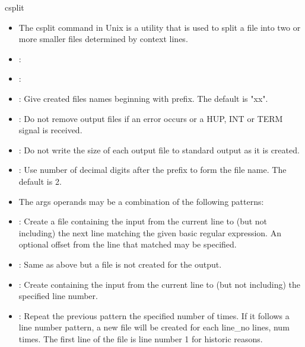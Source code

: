 \documentclass[10pt,t]{beamer}
\begin{document}
\begin{frame}[c]{csplit}
  \begin{itemize}
    \item The csplit command in Unix is a utility that is used to split a file into two or more smaller files determined by context lines.
    \item {}: 
    \item {}:
    \item[]: Give created files names beginning with prefix.  The default is "xx".
    \item[]: Do not remove output files if an error occurs or a HUP, INT or TERM signal is received.
    \item[]: Do not write the size of each output file to standard output as it is created.
    \item[]: Use number of decimal digits after the prefix to form the file name.  The default is 2.
    \item The args operands may be a combination of the following patterns:
    \item[] : Create a file containing the input from the current line to (but not including) the next line matching the given basic regular expression.  An optional offset from the line that matched may be specified.
    \item[] : Same as above but a file is not created for the output.
    \item[] : Create containing the input from the current line to (but not including) the specified line number.
    \item[] : Repeat the previous pattern the specified number of times.  If it follows a line number pattern, a new file will be created for each line\_no lines, num times.  The first line of the file is line number 1 for historic reasons.
  \end{itemize}
\end{frame}
\end{document}
